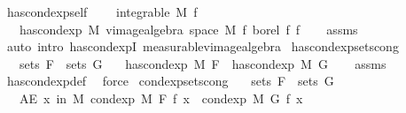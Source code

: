 \begin{isabellebody}
\endisatagproof
{\isafoldproof}%
%
\isadelimproof
%
\endisadelimproof
\isanewline
\isanewline
{}\isamarkupfalse%
\ has{\isacharunderscore}{\kern0pt}cond{\isacharunderscore}{\kern0pt}exp{\isacharunderscore}{\kern0pt}self{\isacharcolon}{\kern0pt}\ \isanewline
\ \ \ {\isachardoublequoteopen}integrable\ M\ f{\isachardoublequoteclose}\isanewline
\ \ \ {\isachardoublequoteopen}has{\isacharunderscore}{\kern0pt}cond{\isacharunderscore}{\kern0pt}exp\ M\ {\isacharparenleft}{\kern0pt}vimage{\isacharunderscore}{\kern0pt}algebra\ {\isacharparenleft}{\kern0pt}space\ M{\isacharparenright}{\kern0pt}\ f\ borel{\isacharparenright}{\kern0pt}\ f\ f{\isachardoublequoteclose}\isanewline
%
\isadelimproof
\ \ %
\endisadelimproof
%
\isatagproof
{}\isamarkupfalse%
\ assms\ \isamarkupfalse%
\ {\isacharparenleft}{\kern0pt}auto\ intro{\isacharbang}{\kern0pt}{\isacharcolon}{\kern0pt}\ has{\isacharunderscore}{\kern0pt}cond{\isacharunderscore}{\kern0pt}expI{\isacharprime}{\kern0pt}\ measurable{\isacharunderscore}{\kern0pt}vimage{\isacharunderscore}{\kern0pt}algebra{}{\isacharparenright}{\kern0pt}%
\endisatagproof
{\isafoldproof}%
%
\isadelimproof
\isanewline
%
\endisadelimproof
\isanewline
{}\isamarkupfalse%
\ has{\isacharunderscore}{\kern0pt}cond{\isacharunderscore}{\kern0pt}exp{\isacharunderscore}{\kern0pt}sets{\isacharunderscore}{\kern0pt}cong{\isacharcolon}{\kern0pt}\isanewline
\ \ \ {\isachardoublequoteopen}sets\ F\ {\isacharequal}{\kern0pt}\ sets\ G{\isachardoublequoteclose}\isanewline
\ \ \ {\isachardoublequoteopen}has{\isacharunderscore}{\kern0pt}cond{\isacharunderscore}{\kern0pt}exp\ M\ F\ {\isacharequal}{\kern0pt}\ has{\isacharunderscore}{\kern0pt}cond{\isacharunderscore}{\kern0pt}exp\ M\ G{\isachardoublequoteclose}\isanewline
%
\isadelimproof
\ \ %
\endisadelimproof
%
\isatagproof
{}\isamarkupfalse%
\ assms\ \isamarkupfalse%
\ has{\isacharunderscore}{\kern0pt}cond{\isacharunderscore}{\kern0pt}exp{\isacharunderscore}{\kern0pt}def\ \isamarkupfalse%
\ force%
\endisatagproof
{\isafoldproof}%
%
\isadelimproof
\isanewline
%
\endisadelimproof
\isanewline
{}\isamarkupfalse%
\ cond{\isacharunderscore}{\kern0pt}exp{\isacharunderscore}{\kern0pt}sets{\isacharunderscore}{\kern0pt}cong{\isacharcolon}{\kern0pt}\isanewline
\ \ \ {\isachardoublequoteopen}sets\ F\ {\isacharequal}{\kern0pt}\ sets\ G{\isachardoublequoteclose}\isanewline
\ \ \ {\isachardoublequoteopen}AE\ x\ in\ M{\isachardot}{\kern0pt}\ cond{\isacharunderscore}{\kern0pt}exp\ M\ F\ f\ x\ {\isacharequal}{\kern0pt}\ cond{\isacharunderscore}{\kern0pt}exp\ M\ G\ f\ x{\isachardoublequoteclose}\isanewline

\end{isabellebody}
